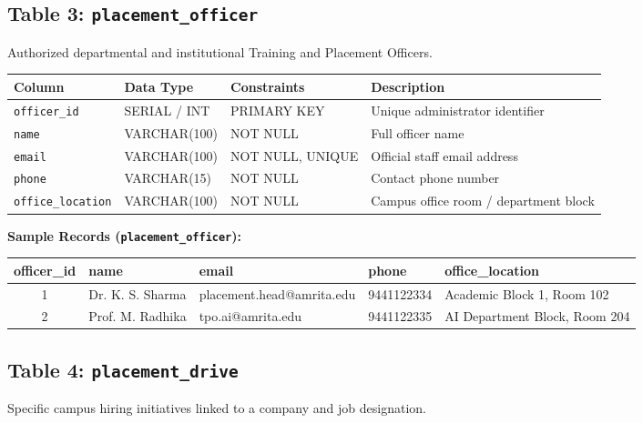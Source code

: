 \documentclass[11pt,a4paper]{article}
\begin{document}
\subsection{Table 3: \texttt{placement\_officer}}
Authorized departmental and institutional Training and Placement Officers.

\begin{table}[H]
    \centering
    \footnotesize
    \begin{tabularx}{\textwidth}{l l l X}
        \toprule
        \textbf{Column} & \textbf{Data Type} & \textbf{Constraints} & \textbf{Description} \\
        \midrule
        \texttt{officer\_id} & SERIAL / INT & PRIMARY KEY & Unique administrator identifier \\
        \texttt{name} & VARCHAR(100) & NOT NULL & Full officer name \\
        \texttt{email} & VARCHAR(100) & NOT NULL, UNIQUE & Official staff email address \\
        \texttt{phone} & VARCHAR(15) & NOT NULL & Contact phone number \\
        \texttt{office\_location} & VARCHAR(100) & NOT NULL & Campus office room / department block \\
        \bottomrule
    \end{tabularx}
\end{table}

\textbf{Sample Records (\texttt{placement\_officer}):}
\begin{table}[H]
    \centering
    \scriptsize
    \begin{tabularx}{\textwidth}{c l l l l}
        \toprule
        \textbf{officer\_id} & \textbf{name} & \textbf{email} & \textbf{phone} & \textbf{office\_location} \\
        \midrule
        1 & Dr. K. S. Sharma & placement.head@amrita.edu & 9441122334 & Academic Block 1, Room 102 \\
        2 & Prof. M. Radhika & tpo.ai@amrita.edu & 9441122335 & AI Department Block, Room 204 \\
        \bottomrule
    \end{tabularx}
\end{table}

\subsection{Table 4: \texttt{placement\_drive}}
Specific campus hiring initiatives linked to a company and job designation.
\end{document}
